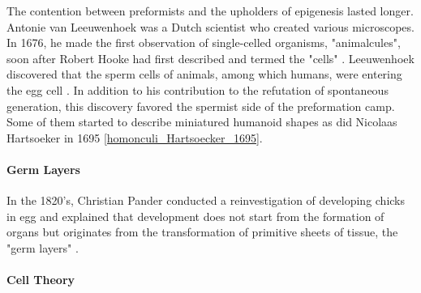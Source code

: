 The contention between preformists and the upholders of epigenesis lasted longer. Antonie van Leeuwenhoek was a Dutch scientist who created various microscopes. In 1676, he made the first observation of single-celled organisms, "animalcules", soon after Robert Hooke had first described and termed the "cells" \cite{Hooke:2005vy}. Leeuwenhoek discovered that the sperm cells of animals, among which humans, were entering the egg cell \cite{Gest:2004fj}. In addition to his contribution to the refutation of spontaneous generation, this discovery favored the spermist side of the preformation camp. Some of them started to describe miniatured humanoid shapes as did Nicolaas Hartsoeker in 1695 \ref{homonculi_Hartsoecker_1695}.

\paragraph{Germ Layers}


In the 1820's, Christian Pander conducted a reinvestigation of developing chicks in egg and explained that development does not start from the formation of organs but originates from the transformation of primitive sheets of tissue, the "germ layers" \cite{Hopwood:2008wy}.

\paragraph{Cell Theory}


